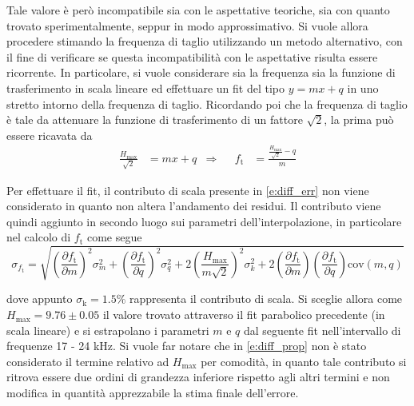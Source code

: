 \documentclass[a4paper,11pt]{article} %
\begin{document}
Tale valore è però incompatibile sia con le aspettative teoriche, sia con quanto trovato sperimentalmente, seppur in
modo approssimativo. Si vuole allora procedere stimando la frequenza di taglio utilizzando un metodo alternativo, con il
fine di verificare se questa incompatibilità con le aspettative risulta essere ricorrente. In particolare, si vuole
considerare sia la frequenza sia la funzione di trasferimento in scala lineare ed effettuare un fit del tipo $y = mx +
q$ in uno stretto intorno della frequenza di taglio. Ricordando poi che la frequenza di taglio è tale da attenuare la
funzione di trasferimento di un fattore $\sqrt{2}$, la prima può essere ricavata da
\begin{align}
	\frac{H_{\text{max}}}{\sqrt{2}}&=mx+q & \Longrightarrow & & f_{\text{t}}&=\frac{\frac{H_{\text{max}}}{\sqrt{2}}-q}{m}
\end{align}

\noindent Per effettuare il fit, il contributo di scala presente in \autoref{e:diff_err} non viene considerato in quanto
non altera l'andamento dei residui. Il contributo viene quindi aggiunto in secondo luogo sui parametri
dell’interpolazione, in particolare nel calcolo di $f_{\text{t}}$ come segue
\begin{equation}\label{e:diff_prop}
	\sigma_{f_{\text{t}}}=\sqrt{
		\left(
			\frac{\partial f_{\text{t}}}{\partial m}
		\right)^2\sigma_m^2+
		\left(
			\frac{\partial f_{\text{t}}}{\partial q}
		\right)^2\sigma_q^2+
		2\left(
			\frac{H_{\text{max}}}{m\sqrt{2}}
		\right)^2\sigma_k^2+
		2\left(
			\frac{\partial f_{\text{t}}}{\partial m}
		\right)
		\left(
			\frac{\partial f_{\text{t}}}{\partial q}
		\right)\text{cov}(m,q)
	}
\end{equation}

\noindent dove appunto $\sigma_{\text{k}}=1.5\%$ rappresenta il contributo di scala. Si sceglie allora come $H_{\text{max}} =
9.76 \pm 0.05$ il valore trovato attraverso il fit parabolico precedente (in scala lineare) e si estrapolano i parametri
$m$ e $q$ dal seguente fit nell'intervallo di frequenze 17 - 24 kHz. Si vuole far notare che in \autoref{e:diff_prop}
non è stato considerato il termine relativo ad $H_{\text{max}}$ per comodità, in quanto tale contributo si ritrova
essere due ordini di grandezza inferiore rispetto agli altri termini e non modifica in quantità apprezzabile la stima
finale dell'errore.
\end{document}
